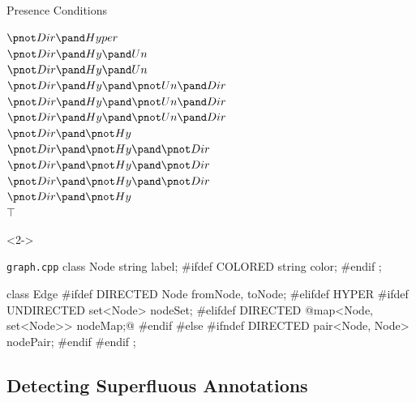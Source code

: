 \begin{frame}[b,fragile]{\myframetitle}
\begin{fancycolumns}[t,columns=3,widths={40,23,37},animation=none]
{\begin{exampletight}{Presence Conditions}
\begin{flushright}
					{\color{lecturegreen}$\pnot Dir \pand Hyper$}\\
					{\color{gray}$\pnot Dir \pand Hy \pand Un$}\\
					{\color{gray}$\pnot Dir \pand Hy \pand Un$}\\
					{\color{lecturered}$\pnot Dir \pand Hy \pand \pnot Un \pand Dir$}\\
					{\color{lecturered}$\pnot Dir \pand Hy \pand \pnot Un \pand Dir$}\\
					{\color{lecturered}$\pnot Dir \pand Hy \pand \pnot Un \pand Dir$}\\
					{\color{gray}$\pnot Dir \pand \pnot Hy$}\\
					{\color{gray}$\pnot Dir \pand \pnot Hy \pand \pnot Dir$}\\
					{\color{gray}$\pnot Dir \pand \pnot Hy \pand \pnot Dir$}\\
					{\color{gray}$\pnot Dir \pand \pnot Hy \pand \pnot Dir$}\\
					{\color{gray}$\pnot Dir \pand \pnot Hy$}\\
					{\color{gray}$\top$}
				\end{flushright}
			\end{exampletight}
		}
	\nextcolumn
		\begin{uncoverenv}<2->
			\begin{cpptight}[basicstyle=\small]{\texttt{graph.cpp}}
class Node {
	string label;
#ifdef COLORED
	string color;
#endif
};

class Edge {
#ifdef DIRECTED
	Node fromNode, toNode;
#elifdef HYPER
#ifdef UNDIRECTED
	set<Node> nodeSet;
#elifdef DIRECTED
	@map<Node, set<Node>> nodeMap;@
#endif
#else
#ifndef DIRECTED
	pair<Node, Node> nodePair;
#endif
#endif
};
			\end{cpptight}
		\end{uncoverenv}
	\end{fancycolumns}
\end{frame}

\subsection{Detecting Superfluous Annotations}

